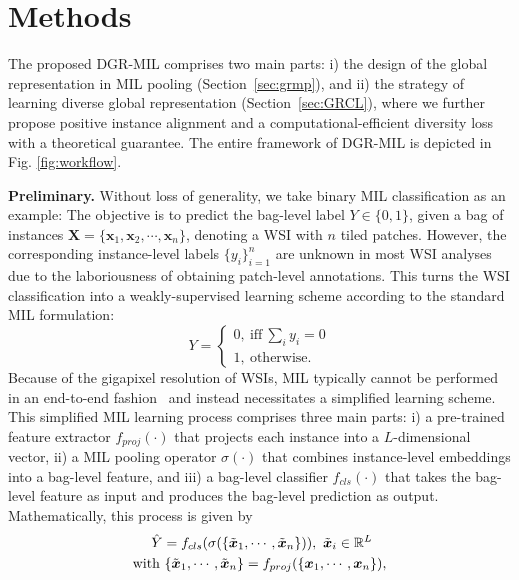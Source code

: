 \documentclass[runningheads]{llncs}
\begin{document}
\section{Methods}
The proposed DGR-MIL comprises two main parts: i) the design of the global representation in MIL pooling (Section~\ref{sec:grmp}), and ii) the strategy of learning diverse global representation (Section~\ref{sec:GRCL}), where we further propose positive instance alignment and a computational-efficient diversity loss with a theoretical guarantee. The entire framework of DGR-MIL is depicted in Fig. \ref{fig:workflow}.

\noindent \textbf{Preliminary.} Without loss of generality, we take binary MIL classification as an example:
The objective is to predict the bag-level label $Y \in \{0, 1\}$, given a bag of instances $\boldsymbol{X} = \{\boldsymbol{x}_1, \boldsymbol{x}_2, \cdots, \boldsymbol{x}_n\}$, denoting a WSI with $n$ tiled patches. However, the corresponding instance-level labels $\{y_i\}_{i=1}^{n}$ are unknown in most WSI analyses due to the laboriousness of obtaining patch-level annotations. This turns the WSI classification into a weakly-supervised learning scheme according to the standard MIL formulation: 
\begin{equation}
    Y = \begin{cases}
     0, \ \text{iff} \ \sum_{i} y_i = 0 \\
     1, \ \text{otherwise}.
    \end{cases}
\end{equation}
Because of the gigapixel resolution of WSIs, MIL typically cannot be performed in an end-to-end fashion~\cite{clam-sb,end2endsupport,end2endsupport2} and instead necessitates a simplified learning scheme. This simplified MIL learning process comprises three main parts: i) a pre-trained feature extractor $f_{proj}(\cdot)$ that projects each instance into a $L$-dimensional vector, ii) a MIL pooling operator $\sigma(\cdot)$ that combines instance-level embeddings into a bag-level feature, and iii) a bag-level classifier $f_{cls}(\cdot)$ that takes the bag-level feature as input and produces the bag-level prediction as output. Mathematically, this process is given by
\begin{equation}
\begin{split}
     & \ \ \ \ \hat{Y} = f_{cls}(\sigma(\{\Tilde{\boldsymbol{x}}_1, \cdots, \Tilde{\boldsymbol{x}}_n\})), \ \Tilde{\boldsymbol{x}}_i \in \mathbb{R}^{L} \\
     & \text{with} \ \{\Tilde{\boldsymbol{x}}_1, \cdots, \Tilde{\boldsymbol{x}}_n\} = f_{proj}(\{\boldsymbol{x}_1, \cdots, \boldsymbol{x}_n\}),
\end{split}
\end{equation}
\end{document}
